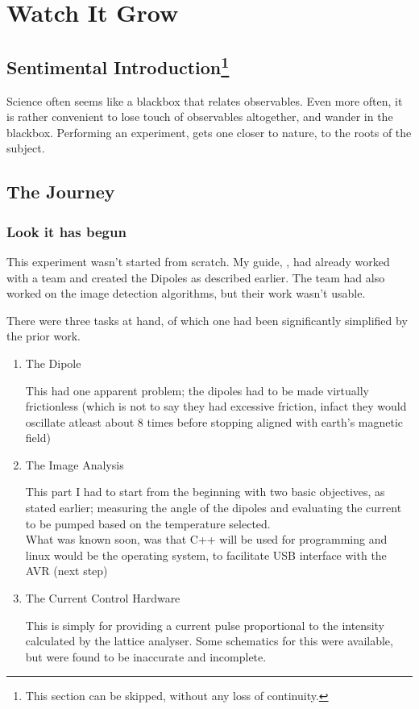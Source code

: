 \chapter{Watch It Grow}

\section{Sentimental Introduction\protect\footnote{This section can be skipped, without any loss of continuity.}}
	Science often seems like a blackbox that relates observables. Even more often, it is rather convenient to lose touch of observables altogether, and wander in the blackbox. Performing an experiment, gets one closer to nature, to the roots of the subject.

\section{The Journey}
	\subsection{Look it has begun}
		This experiment wasn't started from scratch. My guide, \myProf, had already worked with a team and created the Dipoles as described earlier. The team had also worked on the image detection algorithms, but their work wasn't usable.
		\par
		There were three tasks at hand, of which one had been significantly simplified by the prior work.
		\begin{enumerate}
			\item The Dipole
					\par
					This had one apparent problem; the dipoles had to be made virtually frictionless (which is not to say they had excessive friction, infact they would oscillate atleast about 8 times before stopping aligned with earth's magnetic field)
			\item The Image Analysis
					\par
					This part I had to start from the beginning with two basic objectives, as stated earlier; measuring the angle of the dipoles and evaluating the current to be pumped based on the temperature selected.\\
					What was known soon, was that C++ will be used for programming and linux would be the operating system, to facilitate USB interface with the AVR (next step)
			\item The Current Control Hardware
					\par
					This is simply for providing a current pulse proportional to the intensity calculated by the lattice analyser. Some schematics for this were available, but were found to be inaccurate and incomplete.
		\end{enumerate}
	
